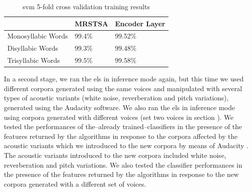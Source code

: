 {\begin{table}[h!]
\centering
\caption{\gls{svm} 5-fold cross validation training results}
\begin{tabular}{|l|l|l|}
\hline
		   & MRSTSA & Encoder Layer \\ \hline
Monosyllabic Words & 99.4\% & 99.52\%          \\ \hline
Disyllabic Words   & 99.3\%   & 99.48\%        \\ \hline
Trisyllabic Words  & 99.5\% & 99.58\%          \\ \hline
\end{tabular}
\label{SVM_Training}
\end{table}

In a second stage, we ran the \glspl{el} in inference mode again, but this time we used different corpora generated using the same voices and manipulated with several types of acoustic variants (white noise, reverberation and pitch variations), generated using the Audacity software. We also ran the \glspl{el} in inference mode using corpora generated with different voices (set two voices in section ). We tested the performances of the--already trained--classifiers in the presence of the features returned by the algorithms in response to the corpora affected by the acoustic variants which we introduced to the new corpora by means of Audacity \cite{audacity}. The acoustic variants introduced to the new corpora included white noise, reverberation and pitch variations. We also tested the classifier performances in the presence of the features returned by the algorithms in response to the new corpora generated with a different set of voices.
}


























